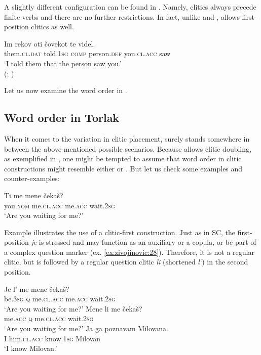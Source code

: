 \documentclass[output=paper,
colorlinks,
citecolor=brown,
newtxmath
]{langscibook}
\begin{document}
\noindent A slightly different configuration can be found in . Namely, clitics always precede finite verbs and there are no further restrictions. In fact, unlike  and ,  allows first-position clitics as well.


\ea\label{ex:zivojinovic:26}
\gll Im           rekov     oti čovekot     te         videl. \\
     them.\textsc{cl.dat}  told.\textsc{1sg}  \textsc{comp}   person.\textsc{def}  you.\textsc{cl.acc} saw\\
\glt `I told them that the person saw you.'\\
\hfill (; \citealt[236]{Franks.King2000})
\z

\noindent Let us now examine the word order in .


\subsection{Word order in Torlak}\largerpage
\label{subsec:orderTorlak}

When it comes to the variation in clitic placement,  surely stands somewhere in between the above-mentioned possible scenarios. Because  allows clitic doubling, as exemplified in , one might be tempted to assume that word order in clitic constructions might resemble either  or . But let us check some examples and counter-examples:


\ea\label{ex:zivojinovic:27}
\gll Ti      me         mene    čekaš?\\
     you.\textsc{nom} me.\textsc{cl.acc}  me.\textsc{acc}  wait.\textsc{2sg} \\
\glt `Are you waiting for me?'
\z

\noindent Example  illustrates the use of a clitic-first construction. Just as in SC, the first-position \textit{je} is stressed and may function as an auxiliary or a copula, or be part of a complex question marker (ex. \ref{ex:zivojinovic:28}). Therefore, it is not a regular clitic, but is followed by a regular question clitic \textit{li} (shortened \textit{l'}) in the second position.


\ea\label{ex:zivojinovic:28}
\gll Je l’  me         mene    čekaš?\\
     be.\textsc{3sg} \textsc{q} me.\textsc{cl.acc}  me.\textsc{acc}  wait.\textsc{2sg} \\
\glt `Are you waiting for me?'
\ex\label{ex:zivojinovic:29}
\gll Mene    li  me         čekaš?\\
     me.\textsc{acc}  \textsc{q}   me.\textsc{cl.acc}  wait.\textsc{2sg} \\
\glt `Are you waiting for me?'
\ex\label{ex:zivojinovic:30}
\gll Ja ga         poznavam Milovana.\\
     I  him.\textsc{cl.acc} know.\textsc{1sg}     Milovan \\
\glt `I know Milovan.'
\z
\end{document}
